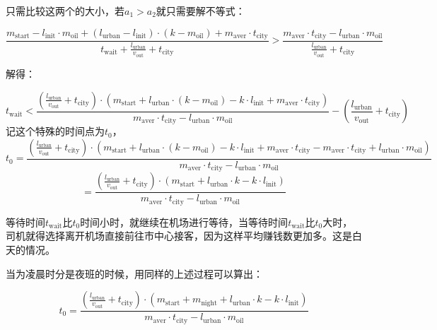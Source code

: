 \documentclass[withoutpreface,bwprint]{cumcmthesis} %
\begin{document}
只需比较这两个的大小，若$a_1>a_2$就只需要解不等式：\par
\begin{equation}
	\frac{m_{\mathrm{start}}-l_{\mathrm{init}}\cdot m_{\mathrm{oil}}+(l_{\mathrm{urban}}-l_{\mathrm{init}})\cdot (k-m_{\mathrm{oil}})+ m_{\mathrm{aver}}\cdot t_{\mathrm{city}}}{t_{ \mathrm{wait}}+\frac{l_{\mathrm{urban}}}{v_{\mathrm{out}}}+t_{\mathrm{city}}} > \frac{m_{\mathrm{aver}}\cdot t_{\mathrm{city}}-l_{\mathrm{urban}}\cdot m_{\mathrm{oil}}}{\frac{l_{\mathrm{urban}}}{v_{\mathrm{out}}}+t_{\mathrm{city}} }
\end{equation}\par
解得：\par
\begin{equation}
	t_{\mathrm{wait}}< \frac{\left(\frac{l_{\mathrm{urban}}}{v_{\mathrm{out}}}+t_{\mathrm{city}}\right)\cdot \left(m_{\mathrm{start}}+ l_{\mathrm{urban}}\cdot (k-m_{\mathrm{oil}}) -k\cdot l_{\mathrm{init}} +   m_{\mathrm{aver}}\cdot t_{\mathrm{city}}\right)}{ m_{\mathrm{aver}}\cdot t_{\mathrm{city}}-l_{\mathrm{urban}}\cdot m_{\mathrm{oil}}} - \left(\frac{l_{\mathrm{urban}}}{v_{\mathrm{out}}}+t_{\mathrm{city}}\right)
\end{equation}
记这个特殊的时间点为$t_0$，
$$
	t_0=  \frac{\left(\frac{l_{\mathrm{urban}}}{v_{\mathrm{out}}}+t_{\mathrm{city}}\right)\cdot \left(m_{\mathrm{start}}+ l_{\mathrm{urban}}\cdot (k-m_{\mathrm{oil}}) -k\cdot l_{\mathrm{init}} +   m_{\mathrm{aver}}\cdot t_{\mathrm{city}}-m_{\mathrm{aver}}\cdot t_{\mathrm{city}}+l_{\mathrm{urban}}\cdot m_{\mathrm{oil}}\right)}{ m_{\mathrm{aver}}\cdot t_{\mathrm{city}}-l_{\mathrm{urban}}\cdot m_{\mathrm{oil}}}
$$
\begin{equation}
	= \frac{\left(\frac{l_{\mathrm{urban}}}{v_{\mathrm{out}}}+t_{\mathrm{city}}\right)\cdot \left(m_{\mathrm{start}}+ l_{\mathrm{urban}}\cdot k -k\cdot l_{\mathrm{init}} \right)}{ m_{\mathrm{aver}}\cdot t_{\mathrm{city}}-l_{\mathrm{urban}}\cdot m_{\mathrm{oil}}}
\end{equation}\par
等待时间$t_{\mathrm{wait}}$比$t_0$时间小时，就继续在机场进行等待，当等待时间$t_{\mathrm{wait}}$比$t_0$大时，司机就得选择离开机场直接前往市中心接客，因为这样平均赚钱数更加多。这是白天的情况。\par
当为凌晨时分是夜班的时候，用同样的上述过程可以算出：\par
\begin{equation}
	t_0= \frac{\left(\frac{l_{\mathrm{urban}}}{v_{\mathrm{out}}}+t_{\mathrm{city}}\right)\cdot \left(m_{\mathrm{start}}+ m_{\mathrm{night}} + l_{\mathrm{urban}}\cdot k -k\cdot l_{\mathrm{init}} \right)}{ m_{\mathrm{aver}}\cdot t_{\mathrm{city}}-l_{\mathrm{urban}}\cdot m_{\mathrm{oil}}}
\end{equation}
\end{document}
